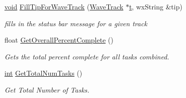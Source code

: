 \begin{DoxyCompactItemize}
\hyperlink{sound_8c_ae35f5844602719cf66324f4de2a658b3}{void} \hyperlink{class_o_d_manager_a76c4c9a6b2b98e3a4f7256667d15b61a}{Fill\+Tip\+For\+Wave\+Track} (\hyperlink{class_wave_track}{Wave\+Track} $\ast$\hyperlink{octave__test_8m_aaccc9105df5383111407fd5b41255e23}{t}, wx\+String \&tip)
\begin{DoxyCompactList}\small\item\em fills in the status bar message for a given track \end{DoxyCompactList}\item 
float \hyperlink{class_o_d_manager_aa71310affea63dba0f3575d6149cd944}{Get\+Overall\+Percent\+Complete} ()
\begin{DoxyCompactList}\small\item\em Gets the total percent complete for all tasks combined. \end{DoxyCompactList}\item 
\hyperlink{xmltok_8h_a5a0d4a5641ce434f1d23533f2b2e6653}{int} \hyperlink{class_o_d_manager_abbeccc9391d24f84f1a2bbd14beba2af}{Get\+Total\+Num\+Tasks} ()
\begin{DoxyCompactList}\small\item\em Get Total Number of Tasks. \end{DoxyCompactList}\end{DoxyCompactItemize}
